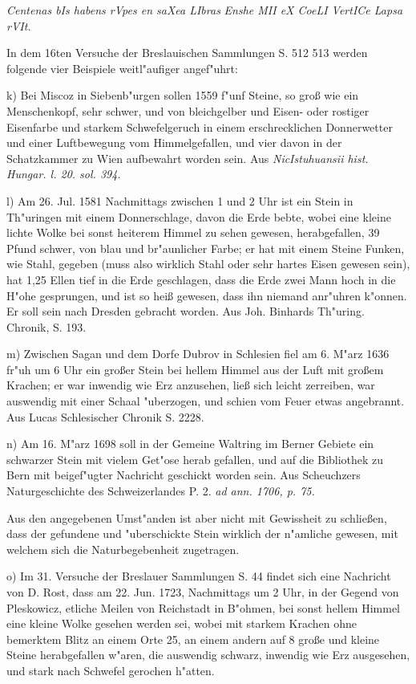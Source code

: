 \documentclass[a4paper, 11pt, oneside, polutonikogreek, german]{article}
\begin{document}
\emph{Centenas bIs habens rVpes en saXea LIbras}  
\emph{Enshe MII eX CoeLI VertICe Lapsa rVIt.}

In dem 16ten Versuche der Breslauischen Sammlungen S. 512 513 werden folgende vier Beispiele weitl"aufiger angef"uhrt:

k) Bei Miscoz in Siebenb"urgen sollen 1559 f"unf Steine, so groß wie ein Menschenkopf, sehr schwer, und von bleichgelber und Eisen- oder rostiger Eisenfarbe und starkem Schwefelgeruch in einem erschrecklichen Donnerwetter und einer Luftbewegung vom Himmelgefallen, und vier davon in der Schatzkammer zu Wien aufbewahrt worden sein. Aus \emph{NicIstuhuansii hist. Hungar. l. 20. sol. 394.}

l) Am 26. Jul. 1581 Nachmittags zwischen 1 und 2 Uhr ist ein Stein in Th"uringen mit einem Donnerschlage, davon die Erde bebte, wobei eine kleine lichte Wolke bei sonst heiterem Himmel zu sehen gewesen, herabgefallen, 39 Pfund schwer, von blau und br"aunlicher Farbe; er hat mit einem Steine Funken, wie Stahl, gegeben (muss also wirklich Stahl oder sehr hartes Eisen gewesen sein), hat 1,25 Ellen tief in die Erde geschlagen, dass die Erde zwei Mann hoch in die H"ohe gesprungen, und ist so heiß gewesen, dass ihn niemand anr"uhren k"onnen. Er soll sein nach Dresden gebracht worden. Aus Joh. Binhards Th"uring. Chronik, S. 193.

m) Zwischen Sagan und dem Dorfe Dubrov in Schlesien fiel am 6. M"arz 1636 fr"uh um 6 Uhr ein großer Stein bei hellem Himmel aus der Luft mit großem Krachen; er war inwendig wie Erz anzusehen, ließ sich leicht zerreiben, war auswendig mit einer Schaal "uberzogen, und schien vom Feuer etwas angebrannt. Aus Lucas Schlesischer Chronik S. 2228.

n) Am 16. M"arz 1698 soll in der Gemeine Waltring im Berner Gebiete ein schwarzer Stein mit vielem Get"ose herab gefallen, und auf die Bibliothek zu Bern mit beigef"ugter Nachricht geschickt worden sein. Aus Scheuchzers Naturgeschichte des Schweizerlandes P. 2. \emph{ad ann. 1706, p. 75.}

Aus den angegebenen Umst"anden ist aber nicht mit Gewissheit zu schließen, dass der gefundene und "uberschickte Stein wirklich der n"amliche gewesen, mit welchem sich die Naturbegebenheit zugetragen.

o) Im 31. Versuche der Breslauer Sammlungen S. 44 findet sich eine Nachricht von D. Rost, dass am 22. Jun. 1723, Nachmittags um 2 Uhr, in der Gegend von Pleskowicz, etliche Meilen von Reichstadt in B"ohmen, bei sonst hellem Himmel eine kleine Wolke gesehen werden sei, wobei mit starkem Krachen ohne bemerktem Blitz an einem Orte 25, an einem andern auf 8 große und kleine Steine herabgefallen w"aren, die auswendig schwarz, inwendig wie Erz ausgesehen, und stark nach Schwefel gerochen h"atten.
\end{document}
